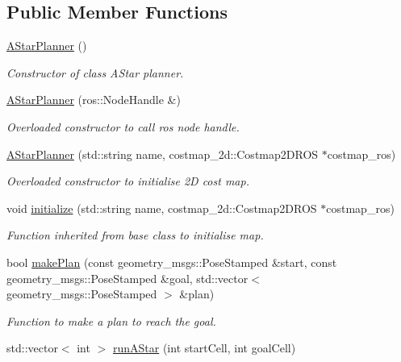\subsection*{Public Member Functions}
\begin{DoxyCompactItemize}
\item 
\hyperlink{classastar__plugin_1_1_a_star_planner_a709090708527da7d103f7c9373f4b651}{A\+Star\+Planner} ()
\begin{DoxyCompactList}\small\item\em Constructor of class A\+Star planner. \end{DoxyCompactList}\item 
\hyperlink{classastar__plugin_1_1_a_star_planner_a79cd3d4231e807ccc04f70d1e4ecd837}{A\+Star\+Planner} (ros\+::\+Node\+Handle \&)
\begin{DoxyCompactList}\small\item\em Overloaded constructor to call ros node handle. \end{DoxyCompactList}\item 
\hyperlink{classastar__plugin_1_1_a_star_planner_a6eaf79c8595c501e03117436fd499e42}{A\+Star\+Planner} (std\+::string name, costmap\+\_\+2d\+::\+Costmap2\+D\+R\+OS $\ast$costmap\+\_\+ros)
\begin{DoxyCompactList}\small\item\em Overloaded constructor to initialise 2D cost map. \end{DoxyCompactList}\item 
void \hyperlink{classastar__plugin_1_1_a_star_planner_abd555da48b7cb20f1fef16962ac0a71c}{initialize} (std\+::string name, costmap\+\_\+2d\+::\+Costmap2\+D\+R\+OS $\ast$costmap\+\_\+ros)
\begin{DoxyCompactList}\small\item\em Function inherited from base class to initialise map. \end{DoxyCompactList}\item 
bool \hyperlink{classastar__plugin_1_1_a_star_planner_a0452b64fca4b454fad7da2249494a9fd}{make\+Plan} (const geometry\+\_\+msgs\+::\+Pose\+Stamped \&start, const geometry\+\_\+msgs\+::\+Pose\+Stamped \&goal, std\+::vector$<$ geometry\+\_\+msgs\+::\+Pose\+Stamped $>$ \&plan)
\begin{DoxyCompactList}\small\item\em Function to make a plan to reach the goal. \end{DoxyCompactList}\item 
std\+::vector$<$ int $>$ \hyperlink{classastar__plugin_1_1_a_star_planner_a70e9cb8c51872dd8f83d1ae4a7006c62}{run\+A\+Star} (int start\+Cell, int goal\+Cell)

\end{DoxyCompactItemize}
